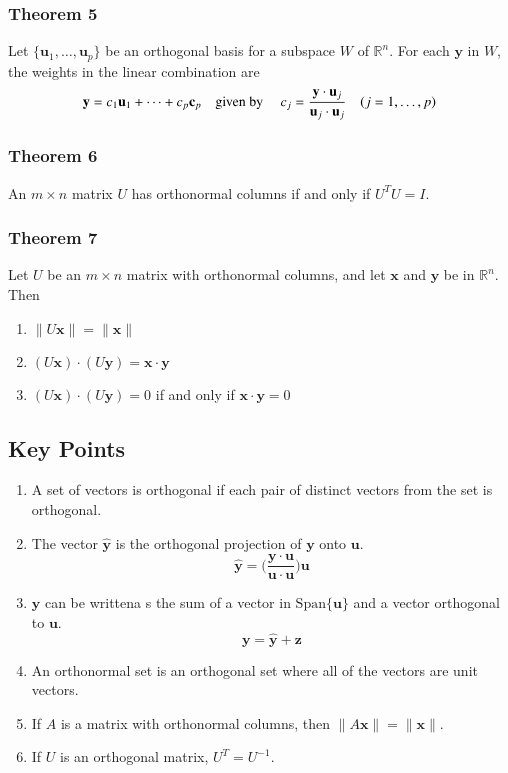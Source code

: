 \documentclass{article}
\begin{document}
\subsubsection*{Theorem 5}
Let $\{\mathbf{u}_1, \ldots, \mathbf{u}_p\}$ be an orthogonal basis for a subspace $W$ of
$\mathbb{R}^n$. For each $\mathbf{y}$ in $W$, the weights in the linear combination are
\[\mathbf{y}=c_1\mathbf{u}_1 + \cdots + c_p\mathbf{c}_p\text{\quad given by \quad} c_j=
\frac{\mathbf{y}\cdot\mathbf{u}_j}{\mathbf{u}_j\cdot \mathbf{u}_j}\quad (j=1, \ldots, p)\]

\subsubsection*{Theorem 6}
An $m\times n$ matrix $U$ has orthonormal columns if and only if $U^T U=I$.

\subsubsection*{Theorem 7}
Let $U$ be an $m\times n$ matrix with orthonormal columns, and let $\mathbf{x}$ and $\mathbf{y}$ be
in $\mathbb{R}^n$. Then
\begin{enumerate}
    \item $\|U\mathbf{x}\|=\|\mathbf{x}\|$
    \item $(U\mathbf{x})\cdot(U\mathbf{y})=\mathbf{x}\cdot\mathbf{y}$
    \item $(U\mathbf{x})\cdot(U\mathbf{y})=0$ if and only if $\mathbf{x}\cdot\mathbf{y}=0$
\end{enumerate}

\subsection*{Key Points}
\begin{enumerate}
    \item A set of vectors is orthogonal if each pair of distinct vectors from the set is
    orthogonal.
    \item The vector $\mathbf{\hat{y}}$ is the orthogonal projection of $\mathbf{y}$ onto
    $\mathbf{u}$.
    \[\mathbf{\hat{y}}=\Bigg(\frac{\mathbf{y\cdot u}}{\mathbf{u\cdot u}}\Bigg)\mathbf{u}\]
    \item $\mathbf{y}$ can be writtena s the sum of a vector in $\text{Span}\{\mathbf{u}\}$ and a
    vector orthogonal to $\mathbf{u}$.
    \[\mathbf{y}=\mathbf{\hat{y}}+\mathbf{z}\]
    \item An orthonormal set is an orthogonal set where all of the vectors are unit vectors.
    \item If $A$ is a matrix with orthonormal columns, then $\|A\mathbf{x}\|=\|\mathbf{x}\|$.
    \item If $U$ is an orthogonal matrix, $U^T=U^{-1}$.
\end{enumerate}
\end{document}
